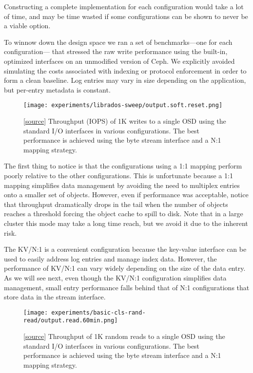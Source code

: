 \documentclass[10pt,twocolumn]{article}
\begin{document}
Constructing a complete implementation for each configuration would take
a lot of time, and may be time wasted if some configurations can be shown
to never be a viable option.

To winnow down the design space we ran a set of benchmarks---one for each
configuration--- that stressed the raw write performance using the built-in,
optimized interfaces on an unmodified version of Ceph. We explicitly avoided
simulating the costs associated with indexing or protocol enforcement in order
to form a clean baseline. Log entries may vary in size depending on the
application, but per-entry metadata is constant.

\begin{figure}[h]
  \centering
  \texttt{[image: experiments/librados-sweep/output.soft.reset.png]}
  \caption{
[\href{https://github.com/noahdesu/zlog-popper/tree/master/experiments/librados-sweep/visualize.ipynb}{source}]
Throughput (IOPS) of 1K writes to a single OSD using the standard I/O
interfaces in various configurations. The best performance is achieved using
the byte stream interface and a N:1 mapping strategy.
}
\end{figure}


The first thing to notice is that the configurations using a 1:1 mapping
perform poorly relative to the other configurations. This is unfortunate
because a 1:1 mapping simplifies data management by avoiding the need to
multiplex entries onto a smaller set of objects. However, even if performance
was acceptable, notice that throughput dramatically drops in the tail when the
number of objects reaches a threshold forcing the object cache to spill to
disk. Note that in a large cluster this mode may take a long time reach,
but we avoid it due to the inherent risk.

The KV/N:1 is a convenient configuration because the key-value interface
can be used to easily address log entries and manage index data. However, the
performance of KV/N:1 can vary widely depending on the size of the data entry.
As we will see next, even though the KV/N:1 configuration simplifies data
management, small entry performance falls behind that of N:1 configurations
that store data in the stream interface.

\begin{figure}[h]
  \centering
  \texttt{[image: experiments/basic-cls-rand-read/output.read.60min.png]}
  \caption{
[\href{https://github.com/noahdesu/zlog-popper/tree/master/experiments/basic-cls-rand-read/visualize.ipynb}{source}]
Throughput of 1K random reads to a single OSD using the standard I/O
interfaces in various configurations. The best performance is achieved using
the byte stream interface and a N:1 mapping strategy.
}
\end{figure}
\end{document}
